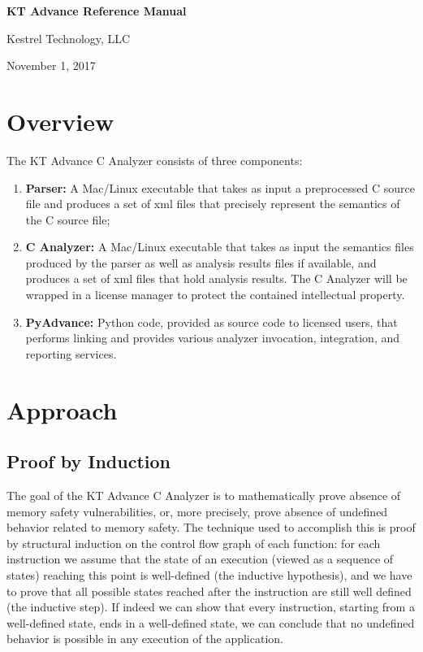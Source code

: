 \documentclass[11pt]{article}
\begin{document}
\vfill
\vfill


{\Large\bf{
KT Advance Reference Manual}}

\vfill

{\Large{Kestrel Technology, LLC}}

\bigskip

November 1, 2017

\vfill
\vfill
\vfill

\newpage
\tableofcontents
\newpage

\section{Overview}

The KT Advance C Analyzer consists of three components:
\begin{enumerate}
\item {\bf Parser:} A Mac/Linux executable that takes as input a preprocessed
C source file and produces a set of xml files that precisely represent the
semantics of the C source file;
\item {\bf C Analyzer:} A Mac/Linux executable that takes as input the
semantics files produced by the parser as well as analysis results files if
available, and produces a set of xml files that hold analysis results. The
C Analyzer will be wrapped in a license manager to protect the contained 
intellectual property.
\item {\bf PyAdvance:} Python code, provided as source code to licensed
users, that performs linking and provides various analyzer invocation, 
integration, and reporting services.
\end{enumerate}

\section{Approach}

\subsection{Proof by Induction}

The goal of the KT Advance C Analyzer is to mathematically prove absence
of memory safety vulnerabilities, or, more precisely, prove absence of
undefined behavior related to memory safety. The technique used to accomplish 
this is proof
by structural induction on the control flow graph of each function: for each
instruction we assume that the state of an execution (viewed as a sequence of states) 
reaching this point is well-defined
(the inductive hypothesis), and we have to prove that all possible states
reached after the instruction are still well defined (the inductive step).
If indeed we can show that every instruction, starting from a well-defined
state, ends in a well-defined state, we can conclude that no undefined
behavior is possible in any execution of the application.
\end{document}
